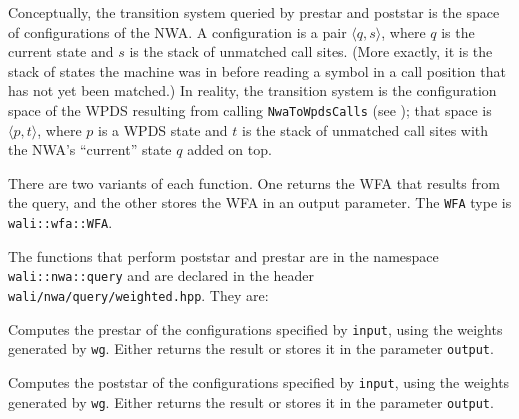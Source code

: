Conceptually, the transition system queried by prestar and poststar is the space of
configurations of the NWA. A configuration is a pair $\langle q, s\rangle$,
where $q$ is the current state and $s$ is the stack of unmatched call
sites. (More exactly, it is the stack of states the machine was in before
reading a symbol in a call position that has not yet been matched.) In
reality,  the transition system is the configuration space of the WPDS
resulting from calling \texttt{NwaToWpdsCalls} (see
); that space is
$\langle p, t\rangle$, where $p$ is a WPDS state and $t$ is the stack of
unmatched call sites with the NWA's ``current'' state $q$ added on top.

There are two variants of each function. One returns the WFA that results from
the query, and the other stores the WFA in an output parameter. The
\texttt{WFA} type is \texttt{wali::wfa::WFA}.

The functions that perform poststar and prestar are in the namespace
\texttt{wali::nwa::query} and are declared in the header
\texttt{wali/nwa/query/weighted.hpp}. They are:
\begin{functionlist}
    Computes the prestar of the configurations specified by
    \texttt{input}, using the weights generated by \texttt{wg}. Either
    returns the result or stores it in the parameter \texttt{output}.

    Computes the poststar of the configurations specified by
    \texttt{input}, using the weights generated by \texttt{wg}. Either
    returns the result or stores it in the parameter \texttt{output}.
\end{functionlist}
